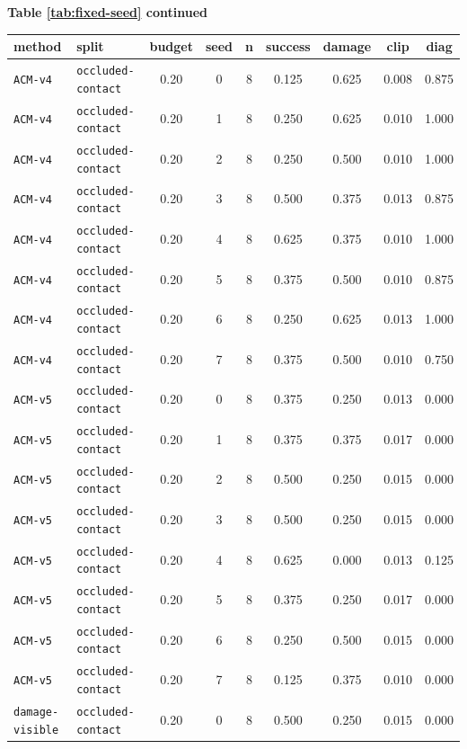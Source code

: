 \documentclass{article}
\begin{document}
\begin{center}
\textbf{Table \ref{tab:fixed-seed} continued}\\[0.4ex]
\begin{tabular}{llccccccc}
\toprule
method & split & budget & seed & n & success & damage & clip & diag \\
\midrule
\texttt{ACM-v4} & \texttt{occluded-contact} & 0.20 & 0 & 8 & 0.125 & 0.625 & 0.008 & 0.875 \\
\texttt{ACM-v4} & \texttt{occluded-contact} & 0.20 & 1 & 8 & 0.250 & 0.625 & 0.010 & 1.000 \\
\texttt{ACM-v4} & \texttt{occluded-contact} & 0.20 & 2 & 8 & 0.250 & 0.500 & 0.010 & 1.000 \\
\texttt{ACM-v4} & \texttt{occluded-contact} & 0.20 & 3 & 8 & 0.500 & 0.375 & 0.013 & 0.875 \\
\texttt{ACM-v4} & \texttt{occluded-contact} & 0.20 & 4 & 8 & 0.625 & 0.375 & 0.010 & 1.000 \\
\texttt{ACM-v4} & \texttt{occluded-contact} & 0.20 & 5 & 8 & 0.375 & 0.500 & 0.010 & 0.875 \\
\texttt{ACM-v4} & \texttt{occluded-contact} & 0.20 & 6 & 8 & 0.250 & 0.625 & 0.013 & 1.000 \\
\texttt{ACM-v4} & \texttt{occluded-contact} & 0.20 & 7 & 8 & 0.375 & 0.500 & 0.010 & 0.750 \\
\texttt{ACM-v5} & \texttt{occluded-contact} & 0.20 & 0 & 8 & 0.375 & 0.250 & 0.013 & 0.000 \\
\texttt{ACM-v5} & \texttt{occluded-contact} & 0.20 & 1 & 8 & 0.375 & 0.375 & 0.017 & 0.000 \\
\texttt{ACM-v5} & \texttt{occluded-contact} & 0.20 & 2 & 8 & 0.500 & 0.250 & 0.015 & 0.000 \\
\texttt{ACM-v5} & \texttt{occluded-contact} & 0.20 & 3 & 8 & 0.500 & 0.250 & 0.015 & 0.000 \\
\texttt{ACM-v5} & \texttt{occluded-contact} & 0.20 & 4 & 8 & 0.625 & 0.000 & 0.013 & 0.125 \\
\texttt{ACM-v5} & \texttt{occluded-contact} & 0.20 & 5 & 8 & 0.375 & 0.250 & 0.017 & 0.000 \\
\texttt{ACM-v5} & \texttt{occluded-contact} & 0.20 & 6 & 8 & 0.250 & 0.500 & 0.015 & 0.000 \\
\texttt{ACM-v5} & \texttt{occluded-contact} & 0.20 & 7 & 8 & 0.125 & 0.375 & 0.010 & 0.000 \\
\texttt{damage-visible} & \texttt{occluded-contact} & 0.20 & 0 & 8 & 0.500 & 0.250 & 0.015 & 0.000 \\

\end{tabular}
\end{center}
\end{document}

